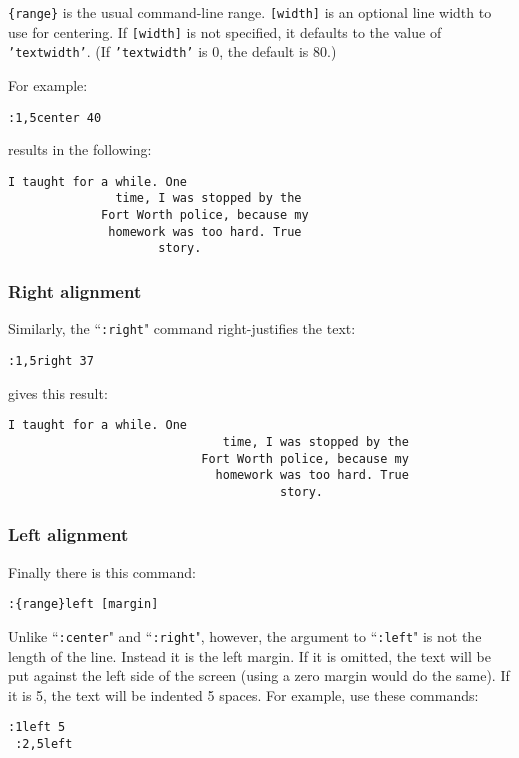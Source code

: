 \texttt{\{range\}} is the usual command-line range.
\texttt{[width]} is an optional line width to use for centering.
If \texttt{[width]} is not specified, it defaults to the value of \texttt{'textwidth'}.
(If \texttt{'textwidth'} is 0, the default is 80.)

For example:

\begin{Verbatim}[samepage=true]
 :1,5center 40
\end{Verbatim}

results in the following:

\begin{Verbatim}[samepage=true]
			   I taught for a while. One
			   time, I was stopped by the
			 Fort Worth police, because my
			  homework was too hard. True
				     story.
\end{Verbatim}
\subsubsection{Right alignment}
Similarly, the ``\texttt{:right}" command right-justifies the text:

\begin{Verbatim}[samepage=true]
 :1,5right 37
\end{Verbatim}

gives this result:

\begin{Verbatim}[samepage=true]
						       I taught for a while. One
						      time, I was stopped by the
						   Fort Worth police, because my
						     homework was too hard. True
									  story.
\end{Verbatim}
\subsubsection{Left alignment}
Finally there is this command:

\begin{Verbatim}[samepage=true]
 :{range}left [margin]
\end{Verbatim}

Unlike ``\texttt{:center}" and ``\texttt{:right}", however, the argument to ``\texttt{:left}" is not the length of the line.
Instead it is the left margin.
If it is omitted, the text will be put against the left side of the screen (using a zero margin would do the same).
If it is 5, the text will be indented 5 spaces.
For example, use these commands:

\begin{Verbatim}[samepage=true]
 :1left 5
 :2,5left
\end{Verbatim}


